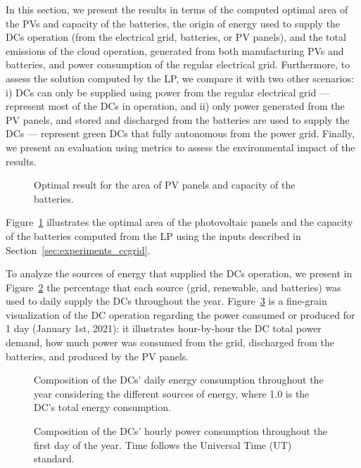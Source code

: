 In this section, we present the results in terms of the computed optimal area of the PVs and capacity of the batteries, the origin of energy used to supply the DCs operation (from the electrical grid, batteries, or PV panels), and the total emissions of the cloud operation, generated from both manufacturing PVs and batteries, and power consumption of the regular electrical grid. Furthermore, to assess the solution computed by the LP, we compare it with two other scenarios: i) DCs can only be supplied using power from the regular electrical grid --- represent most of the DCs in operation, and ii) only power generated from the PV panels, and stored and discharged from the batteries are used to supply the DCs --- represent green DCs that fully autonomous from the power grid. Finally, we present an evaluation using metrics to assess the environmental impact of the results.


\begin{figure}[!htbp]
  \centering
  {}
  \caption{Optimal result for the area of PV panels and capacity of the batteries.}
  \label{fig:sizing}
\end{figure}

Figure~\ref{fig:sizing} illustrates the optimal area of the photovoltaic panels and the capacity of the batteries computed from the LP using the inputs described in Section~\ref{sec:experiments_ccgrid}.

To analyze the sources of energy that supplied the DCs operation, we present in Figure~\ref{fig:energy_ratio_daily} the percentage that each source (grid, renewable, and batteries) was used to daily supply the DCs throughout the year. Figure~\ref{fig:power_ratio_hourly} is a fine-grain visualization of the DC operation regarding the power consumed or produced for 1 day (January 1st, 2021): it illustrates hour-by-hour the DC total power demand, how much power was consumed from the  grid, discharged from the batteries, and produced by the PV panels.
 

\begin{figure}[!htbp]
  \centering
   {}
  \caption{Composition of the DCs' daily energy consumption throughout the year considering the different sources of energy, where 1.0 is the DC's total energy consumption.}
  \label{fig:energy_ratio_daily}
\end{figure}




 \begin{figure}[!htbp]
  \centering
   {}
  \caption{Composition of the DCs' hourly power consumption throughout the first day of the year. Time follows the Universal Time (UT) standard.}
  \label{fig:power_ratio_hourly}
\end{figure}

